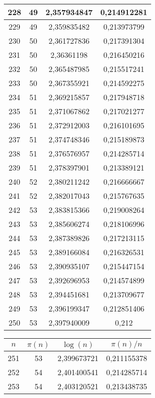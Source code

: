 {\begin{minipage}[!h]{0.45\textwidth}
\begin{longtable}{cccc}
228 & 49 & 2,357934847 & 0,214912281 \\ \hline
229 & 49 & 2,359835482 & 0,213973799 \\ \hline
230 & 50 & 2,361727836 & 0,217391304 \\ \hline
231 & 50 & 2,36361198 & 0,216450216 \\ \hline
232 & 50 & 2,365487985 & 0,215517241 \\ \hline
233 & 50 & 2,367355921 & 0,214592275 \\ \hline
234 & 51 & 2,369215857 & 0,217948718 \\ \hline
235 & 51 & 2,371067862 & 0,217021277 \\ \hline
236 & 51 & 2,372912003 & 0,216101695 \\ \hline
237 & 51 & 2,374748346 & 0,215189873 \\ \hline
238 & 51 & 2,376576957 & 0,214285714 \\ \hline
239 & 51 & 2,378397901 & 0,213389121 \\ \hline
240 & 52 & 2,380211242 & 0,216666667 \\ \hline
241 & 52 & 2,382017043 & 0,215767635 \\ \hline
242 & 53 & 2,383815366 & 0,219008264 \\ \hline
243 & 53 & 2,385606274 & 0,218106996 \\ \hline
244 & 53 & 2,387389826 & 0,217213115 \\ \hline
245 & 53 & 2,389166084 & 0,216326531 \\ \hline
246 & 53 & 2,390935107 & 0,215447154 \\ \hline
247 & 53 & 2,392696953 & 0,214574899 \\ \hline
248 & 53 & 2,394451681 & 0,213709677 \\ \hline
249 & 53 & 2,396199347 & 0,212851406 \\ \hline
250 & 53 & 2,397940009 & 0,212 \\ \hline
\end{longtable}
\end{minipage}
\begin{minipage}[!h]{0.45\textwidth}\centering
\tiny
\begin{longtable}{cccc} \hline
\(n\) & \(\pi(n)\) & \(\log(n)\) & \(\pi(n)/n\) \\ \hline
251 & 53 & 2,399673721 & 0,211155378 \\ \hline
252 & 54 & 2,401400541 & 0,214285714 \\ \hline
253 & 54 & 2,403120521 & 0,213438735 \\ \hline

\end{longtable}
\end{minipage}}
